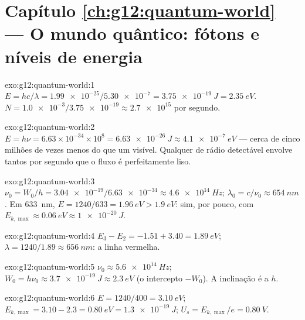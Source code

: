 \section*{Capítulo \ref{ch:g12:quantum-world} --- O mundo quântico: fótons e níveis de energia}

\begin{solution}{exo:g12:quantum-world:1}
$E = hc/\lambda = \num{1.99e-25}/\num{5.30e-7} = \qty{3.75e-19}{J} =
\qty{2.35}{eV}$. $N = \num{1.0e-3}/\num{3.75e-19} \approx \num{2.7e15}$
 por segundo.
\end{solution}

\begin{solution}{exo:g12:quantum-world:2}
$E = h\nu = 6.63\times10^{-34} \times 10^{8} = \qty{6.63e-26}{J} \approx
\qty{4.1e-7}{eV}$ --- cerca de cinco milhões de vezes menos do que um
 visível. Qualquer  de rádio detectável envolve tantos 
por segundo que o fluxo é perfeitamente liso.
\end{solution}

\begin{solution}{exo:g12:quantum-world:3}
$\nu_0 = W_0/h = \num{3.04e-19}/\num{6.63e-34} \approx \qty{4.6e14}{Hz}$;
$\lambda_0 = c/\nu_0 \approx \qty{654}{nm}$. Em \qty{633}{nm},
$E = 1240/633 = \qty{1.96}{eV} > \qty{1.9}{eV}$: sim, por pouco, com
$E_{k,\max} \approx \qty{0.06}{eV} \approx \qty{1e-20}{J}$.
\end{solution}

\begin{solution}{exo:g12:quantum-world:4}
$E_3 - E_2 = -1.51 + 3.40 = \qty{1.89}{eV}$;
$\lambda = 1240/1.89 \approx \qty{656}{nm}$: a linha vermelha.
\end{solution}

\begin{solution}{exo:g12:quantum-world:5}
$\nu_0 \approx \qty{5.6e14}{Hz}$;
$W_0 = h\nu_0 \approx \qty{3.7e-19}{J} \approx \qty{2.3}{eV}$ (o
intercepto $-W_0$). A inclinação é a  $h$.
\end{solution}

\begin{solution}{exo:g12:quantum-world:6}
$E = 1240/400 = \qty{3.10}{eV}$;
$E_{k,\max} = 3.10 - 2.3 = \qty{0.80}{eV} = \qty{1.3e-19}{J}$;
$U_s = E_{k,\max}/e = \qty{0.80}{V}$.
\end{solution}

